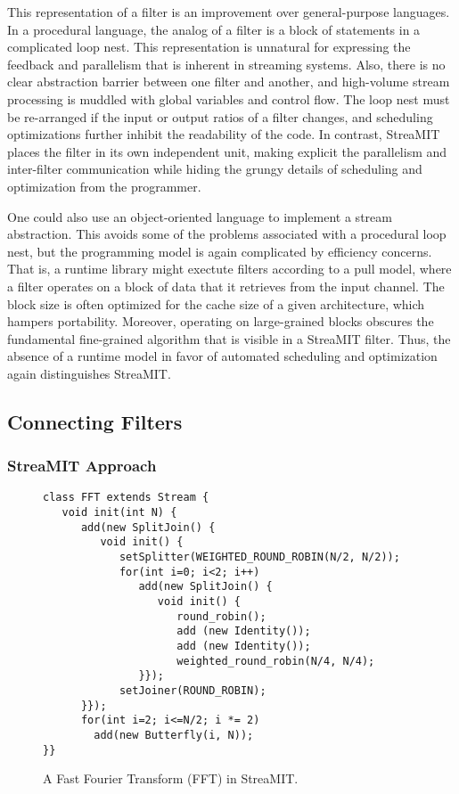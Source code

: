 This representation of a filter is an improvement over general-purpose
languages.  In a procedural language, the analog of a filter is a
block of statements in a complicated loop nest.  This representation
is unnatural for expressing the feedback and parallelism that is
inherent in streaming systems.  Also, there is no clear abstraction
barrier between one filter and another, and high-volume stream
processing is muddled with global variables and control flow.  The
loop nest must be re-arranged if the input or output ratios of a
filter changes, and scheduling optimizations further inhibit the
readability of the code.  In contrast, StreaMIT places the filter in
its own independent unit, making explicit the parallelism and
inter-filter communication while hiding the grungy details of
scheduling and optimization from the programmer.

One could also use an object-oriented language to implement a stream
abstraction.  This avoids some of the problems associated with a
procedural loop nest, but the programming model is again complicated
by efficiency concerns.  That is, a runtime library might exectute
filters according to a pull model, where a filter operates on a block
of data that it retrieves from the input channel.  The block size is
often optimized for the cache size of a given architecture, which
hampers portability.  Moreover, operating on large-grained blocks
obscures the fundamental fine-grained algorithm that is visible in a
StreaMIT filter.  Thus, the absence of a runtime model in favor of
automated scheduling and optimization again distinguishes StreaMIT.

\subsection{Connecting Filters}

\subsubsection{StreaMIT Approach}

\begin{figure}
\scriptsize
\begin{verbatim}
class FFT extends Stream {
   void init(int N) {
      add(new SplitJoin() {
         void init() {
            setSplitter(WEIGHTED_ROUND_ROBIN(N/2, N/2));
            for(int i=0; i<2; i++) 
               add(new SplitJoin() {
                  void init() {
                     round_robin();
                     add (new Identity());
                     add (new Identity());
                     weighted_round_robin(N/4, N/4);
               }});
            setJoiner(ROUND_ROBIN);
      }});
      for(int i=2; i<=N/2; i *= 2)
        add(new Butterfly(i, N));
}}
\end{verbatim}
\vspace{-12pt}
\caption{\protect\small A Fast Fourier Transform (FFT) in StreaMIT.
\protect\label{fig:fft}}
\vspace{-12pt}
\end{figure}

